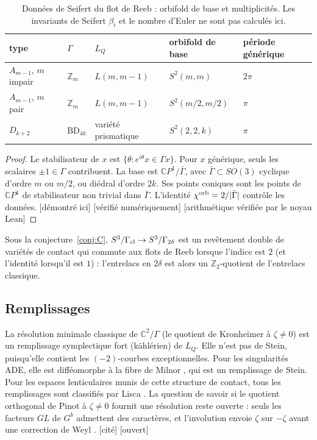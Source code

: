 \documentclass[11pt]{article}
\theoremstyle{definition}
\theoremstyle{remark}
\newcommand{\tagP}{\textsf{\small[démontré ici]}}
\newcommand{\tagC}{\textsf{\small[cité]}}
\newcommand{\tagN}{\textsf{\small[vérifié numériquement]}}
\newcommand{\tagK}{\textsf{\small[arithmétique vérifiée par le noyau Lean]}}
\newcommand{\tagO}{\textsf{\small\textcolor{red!70!black}{[ouvert]}}}
\newcommand{\C}{\mathbb{C}}\newcommand{\R}{\mathbb{R}}\newcommand{\Z}{\mathbb{Z}}
\newcommand{\BD}{\mathrm{BD}}
\begin{document}
\begin{table}[h]\centering\small
\begin{tabular}{@{}lllll@{}}\toprule
type & $\Gamma$ & $L_Q$ & orbifold de base & période générique\\\midrule
$A_{m-1}$, $m$ impair & $\Z_m$ & $L(m,m-1)$ & $S^2(m,m)$ & $2\pi$\\
$A_{m-1}$, $m$ pair & $\Z_m$ & $L(m,m-1)$ & $S^2(m/2,m/2)$ & $\pi$\\
$D_{k+2}$ & $\BD_{4k}$ & variété prismatique & $S^2(2,2,k)$ & $\pi$\\\bottomrule
\end{tabular}
\caption{Données de Seifert du flot de Reeb : orbifold de base et multiplicités. Les invariants de Seifert $\beta_i$ et le nombre d'Euler ne sont pas calculés ici.}\label{tab:seifert}
\end{table}
\begin{proof}
Le stabilisateur de $x$ est $\{\theta : e^{i\theta}x\in\Gamma x\}$. Pour $x$ générique, seuls les scalaires $\pm1\in\Gamma$ contribuent. La base est $\C P^1/\bar\Gamma$, avec $\bar\Gamma\subset SO(3)$ cyclique d'ordre $m$ ou $m/2$, ou diédral d'ordre $2k$. Ses points coniques sont les points de $\C P^1$ de stabilisateur non trivial dans $\bar\Gamma$. L'identité $\chi^{\rm orb}=2/|\bar\Gamma|$ contrôle les données. \tagP{} \tagN{} \tagK
\end{proof}

Sous la conjecture~\ref{conj:C}, $S^3/\Gamma_{\rm cl}\to S^3/\Gamma_{2\delta}$ est un revêtement double de variétés de contact qui commute aux flots de Reeb lorsque l'indice est $2$ (et l'identité lorsqu'il est $1$) : l'entrelacs en $2\delta$ est alors un $\Z_2$-quotient de l'entrelacs classique.

\subsection{Remplissages}
La résolution minimale classique de $\C^2/\Gamma$ (le quotient de Kronheimer à $\zeta\ne0$) est un remplissage symplectique fort (kählérien) de $L_Q$. Elle n'est pas de Stein, puisqu'elle contient les $(-2)$-courbes exceptionnelles. Pour les singularités ADE, elle est difféomorphe à la fibre de Milnor \cite{Bri71}, qui est un remplissage de Stein. Pour les espaces lenticulaires munis de cette structure de contact, tous les remplissages sont classifiés par Lisca \cite{Lis08}. La question de savoir si le quotient orthogonal de Pinot à $\zeta\ne0$ fournit une résolution reste ouverte : seuls les facteurs $GL$ de $G^b$ admettent des caractères, et l'involution envoie $\zeta$ sur $-\zeta$ avant une correction de Weyl \cite{Nak25}. \tagC{} \tagO
\end{document}
